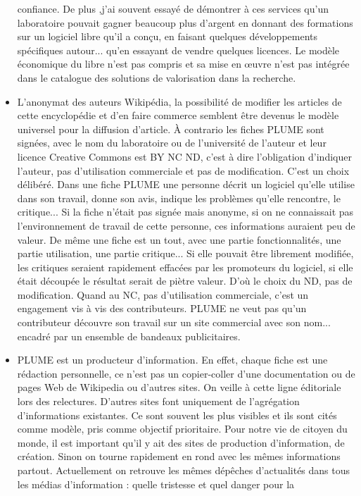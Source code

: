 \documentclass{FramateX}
\begin{document}
\begin{refsection}
\begin{itemize}
confiance. De plus ,j'ai souvent essayé de démontrer à ces services
qu'un laboratoire pouvait gagner beaucoup plus d'argent en donnant des
formations sur un logiciel libre qu'il a conçu, en faisant quelques
développements spécifiques autour... qu'en essayant de vendre quelques
licences. Le modèle économique du libre n'est pas compris et sa mise en
œuvre n'est pas intégrée dans le catalogue des solutions de
valorisation dans la recherche.
\item L'anonymat des auteurs Wikipédia, la possibilité de modifier les
articles de cette encyclopédie et d'en faire commerce semblent être
devenus le modèle universel pour la diffusion d'article. À contrario
les fiches PLUME sont signées, avec le nom du laboratoire ou de
l'université de l'auteur et leur licence Creative Commons est BY NC ND,
c'est à dire l'obligation d'indiquer l'auteur, pas d'utilisation
commerciale et pas de modification. C'est un choix délibéré. Dans une
fiche PLUME une personne décrit un logiciel qu'elle utilise dans son
travail, donne son avis, indique les problèmes qu'elle rencontre, le
critique... Si la fiche n'était pas signée mais anonyme, si on ne
connaissait pas l'environnement de travail de cette personne, ces
informations auraient peu de valeur. De même une fiche est un tout,
avec une partie fonctionnalités, une partie utilisation, une partie
critique... Si elle pouvait être librement modifiée, les critiques
seraient rapidement effacées par les promoteurs du logiciel, si elle
était découpée le résultat serait de piètre valeur. D'où le choix du
ND, pas de modification. Quand au NC, pas d'utilisation commerciale,
c'est un engagement vis à vis des contributeurs. PLUME ne veut pas
qu'un contributeur découvre son travail sur un site commercial avec son
nom... encadré par un ensemble de bandeaux publicitaires.
\item PLUME est un producteur d'information. En effet, chaque fiche est
une rédaction personnelle, ce n'est pas un copier-coller d'une
documentation ou de pages Web de Wikipedia ou d'autres sites. On veille
à cette ligne éditoriale lors des relectures. D'autres sites font
uniquement de l'agrégation d'informations existantes. Ce sont souvent
les plus visibles et ils sont cités comme modèle, pris comme objectif
prioritaire. Pour notre vie de citoyen du monde, il est important qu'il
y ait des sites de production d'information, de création. Sinon on
tourne rapidement en rond avec les mêmes informations partout.
Actuellement on retrouve les mêmes dépêches d'actualités dans tous les
médias d'information : quelle tristesse et quel danger pour la

\end{itemize}
\end{refsection}
\end{document}
